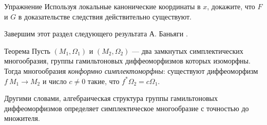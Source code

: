 \begin{thm*}{Упражнение}
Используя локальные канонические координаты в $x$, докажите, что $F$ и $G$ в доказательстве следствия действительно существуют.
\end{thm*}

Завершим этот раздел  следующего результата А. Баньяги \cite{B2}.

\begin{thm}{Теорема}\label{1.5.D}
Пусть $(M_1, \Omega_1)$ и $(M_2, \Omega_2)$ --- два замкнутых симплектических многообразия, группы гамильтоновых диффеоморфизмов которых изоморфны.
Тогда многообразия \emph{конформно симплектоморфны}: существуют диффеоморфизм $f\: M_1 \to  M_2$ и число $c \ne 0$ такие, что $f^\ast \Omega_2 = c\Omega_1$. 
\end{thm}

Другими словами, алгебраическая структура группы гамильтоновых диффеоморфизмов определяет симплектическое многообразие с точностью до множителя.




